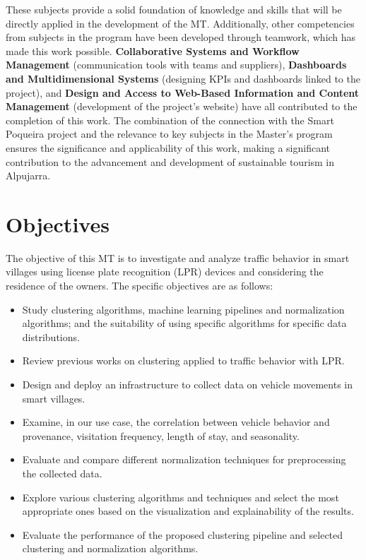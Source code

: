 These subjects provide a solid foundation of knowledge and skills that will be directly applied in the development of the MT. Additionally, other competencies from subjects in the program have been developed through teamwork, which has made this work possible. \textbf{Collaborative Systems and Workflow Management} (communication tools with teams and suppliers), \textbf{Dashboards and Multidimensional Systems} (designing KPIs and dashboards linked to the project), and \textbf{Design and Access to Web-Based Information and Content Management} (development of the project's website) have all contributed to the completion of this work. The combination of the connection with the Smart Poqueira project and the relevance to key subjects in the Master's program ensures the significance and applicability of this work, making a significant contribution to the advancement and development of sustainable tourism in Alpujarra.
 
\section{Objectives} \label{objetivos}


The objective of this MT is to investigate and analyze traffic behavior in smart villages using license plate recognition (LPR) devices and considering the residence of the owners. The specific objectives are as follows:

\begin{itemize}

\item Study clustering algorithms, machine learning pipelines and normalization algorithms; and the suitability of using specific algorithms for specific data distributions.

\item Review previous works on clustering applied to traffic behavior with LPR.

\item Design and deploy an infrastructure to collect data on vehicle movements in smart villages.

\item Examine, in our use case, the correlation between vehicle behavior and provenance, visitation frequency, length of stay, and seasonality.

\item Evaluate and compare different normalization techniques for preprocessing the collected data.

\item Explore various clustering algorithms and techniques and select the most appropriate ones based on the visualization and explainability of the results.

\item Evaluate the performance of the proposed clustering pipeline and selected clustering and normalization algorithms.
\end{itemize}

